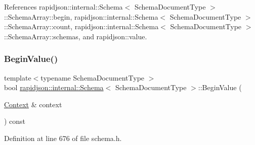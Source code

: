 References rapidjson\+::internal\+::\+Schema$<$ Schema\+Document\+Type $>$\+::\+Schema\+Array\+::begin, rapidjson\+::internal\+::\+Schema$<$ Schema\+Document\+Type $>$\+::\+Schema\+Array\+::count, rapidjson\+::internal\+::\+Schema$<$ Schema\+Document\+Type $>$\+::\+Schema\+Array\+::schemas, and rapidjson\+::value.

\mbox{\label{classrapidjson_1_1internal_1_1_schema_abc55e67708a79ef20f2d9bb969a66949}} 
\subsubsection{\texorpdfstring{BeginValue()}{BeginValue()}}
{\footnotesize\ttfamily template$<$typename Schema\+Document\+Type $>$ \\
bool \mbox{\hyperlink{classrapidjson_1_1internal_1_1_schema}{rapidjson\+::internal\+::\+Schema}}$<$ Schema\+Document\+Type $>$\+::Begin\+Value (\begin{DoxyParamCaption}\item[{\mbox{\hyperlink{classrapidjson_1_1internal_1_1_schema_afca06b1f51d1bc18403bdf3f4d55ffef}{Context}} \&}]{context }\end{DoxyParamCaption}) const}



Definition at line 676 of file schema.\+h.


